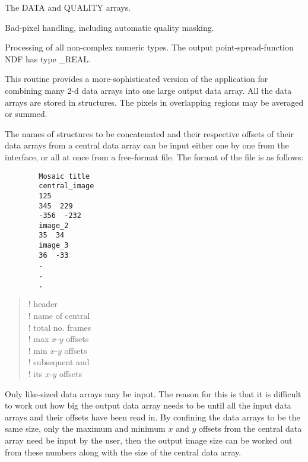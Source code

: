 {{{{         \sstitem
         The DATA and QUALITY arrays.

         \sstitem
         Bad-pixel handling, including automatic quality masking.

         \sstitem
         Processing of all non-complex numeric types.  The output
         point-spread-function NDF has type \_REAL.
      }
   }
}

\newpage
{}
\begin{manroutinedescription}
  This routine provides a more-sophisticated version of the {}
  application for combining many 2-d data arrays into one large
  output data array. All the data arrays are stored in {}
  structures.  The pixels in overlapping regions may be averaged or
  summed.

  The names of {} structures to be concatenated and their
  respective offsets of their data arrays from a central
  data array can be input either one by one from the interface, or
  all at once from a free-format file.  The format of the file is
  as follows:  \mbox {}

\begin{minipage}[t]{60mm}
\begin{verbatim}
        Mosaic title
        central_image
        125
        345  229
        -356  -232
        image_2
        35  34
        image_3
        36  -33
        .
        .
        .

\end{verbatim}
\end{minipage}
\begin{minipage}[t]{60mm}
\begin{verse}

! header \\
! name of central {} \\
! total no. frames \\
! max {$x$}-{$y$} offsets \\
! min {$x$}-{$y$} offsets \\
! subsequent {} and \\
! its {$x$}-{$y$} offsets
\end{verse}
\end{minipage}

  Only like-sized data arrays may be input. The reason for this is
  that it is difficult to work out how big the output data array
  needs to be until all the input data arrays and their offsets have
  been read in. By confining the data arrays to be the same size,
  only the maximum and minimum {$x$} and {$y$} offsets from the central data
  array need be input by the user, then the output image size can be
  worked out from these numbers along with the size of the central
  data array.


\end{manroutinedescription}}
